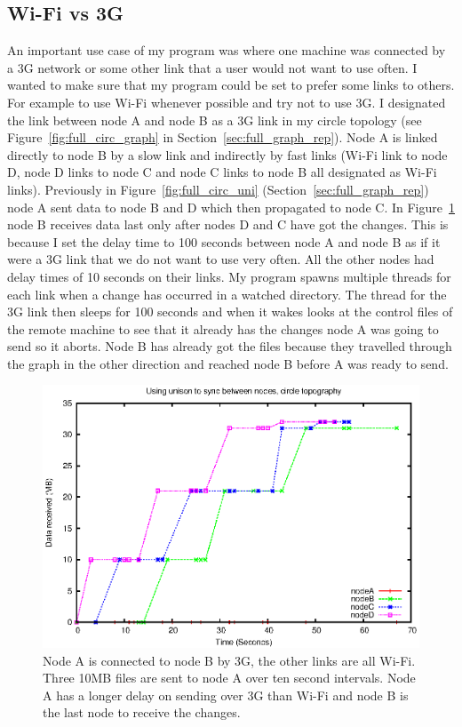 \documentclass[12pt]{article}
\begin{document}
\subsection{Wi-Fi vs 3G}
An important use case of my program was where one machine was connected
by a 3G network or some other link that a user would not want to use
often.  I wanted to make sure that my program could be set to prefer
some links to others. For example to use Wi-Fi whenever possible and try not to
use 3G. I designated the link between node A and node B as a 3G link
in my circle topology (see Figure~\ref{fig:full_circ_graph} in Section~\ref{sec:full_graph_rep}). Node A is linked directly to node B by a slow link and indirectly
by fast links (Wi-Fi link to node D, node D links to node C and node C links
to node B all designated as Wi-Fi links). Previously in Figure~\ref{fig:full_circ_uni} (Section~\ref{sec:full_graph_rep}) node A sent data to
node B and D which then propagated to node C.
In Figure~\ref{fig:circ_uni_thread_100} node B receives data last only after nodes D and C have got the changes.
This is because I set the delay time to 100 seconds between node A and node B
as if it were a 3G link that we do not want to use very often. All the other
nodes had delay times of 10 seconds on their links. My program
spawns multiple threads for each link when a change has occurred in a
watched directory. The thread for the 3G link then sleeps for 100 seconds
and when it wakes looks at the control files of the remote machine to
see that it already has the changes node A was going to send so it aborts.
Node B has already got the files because they travelled through the graph
in the other direction and reached node B before A was ready to send.

\begin{figure}[htp]
    \centering
    \includegraphics[height=0.5\textheight]{images/circ-uni-thread-100.eps}
    \caption{Node A is connected to node B by 3G, the other links are all Wi-Fi. Three 10MB files are sent to node A over ten second intervals. Node A has a longer delay on sending over 3G than Wi-Fi and node B is the last node to receive the changes.}
    \label{fig:circ_uni_thread_100}
\end{figure}
\end{document}
